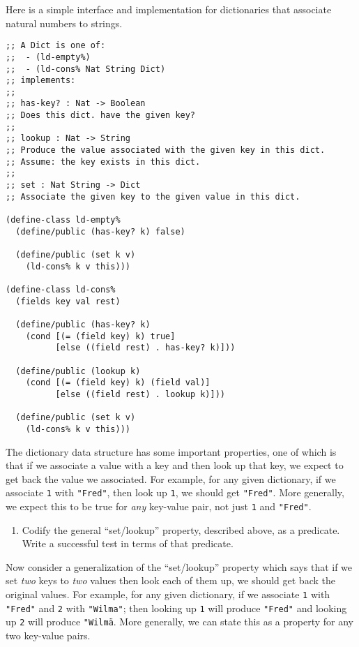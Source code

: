 \documentclass[12pt]{article}                   %
\def\pts#1{\marginpar{\footnotesize \raggedright  \fbox{#1 {\sc Points}}}}
\newcommand\code[1]{\texttt{#1}}
\begin{document}
\begin{problem} \pts{15}
%
Here is a simple interface and implementation for dictionaries that
associate natural numbers to strings.

\begin{verbatim}
;; A Dict is one of:
;;  - (ld-empty%)
;;  - (ld-cons% Nat String Dict)
;; implements:
;;
;; has-key? : Nat -> Boolean
;; Does this dict. have the given key?
;;
;; lookup : Nat -> String
;; Produce the value associated with the given key in this dict.
;; Assume: the key exists in this dict.
;;
;; set : Nat String -> Dict
;; Associate the given key to the given value in this dict.

(define-class ld-empty%
  (define/public (has-key? k) false)

  (define/public (set k v)
    (ld-cons% k v this)))

(define-class ld-cons%
  (fields key val rest)

  (define/public (has-key? k)
    (cond [(= (field key) k) true]
          [else ((field rest) . has-key? k)]))

  (define/public (lookup k)
    (cond [(= (field key) k) (field val)]
          [else ((field rest) . lookup k)]))

  (define/public (set k v)
    (ld-cons% k v this)))
\end{verbatim}

The dictionary data structure has some important properties, one of
which is that if we associate a value with a key and then look up that
key, we expect to get back the value we associated.  For example, for
any given dictionary, if we associate \code{1} with \code{"Fred"},
then look up \code{1}, we should get \code{"Fred"}.  More generally,
we expect this to be true for \emph{any} key-value pair, not just
\code{1} and \code{"Fred"}.

\begin{enumerate}
\item Codify the general ``set/lookup'' property, described above, as
  a predicate.  Write a successful test in terms of that predicate.
\end{enumerate}

Now consider a generalization of the ``set/lookup'' property which
says that if we set \emph{two} keys to \emph{two} values then look
each of them up, we should get back the original values.  For example, for
any given dictionary, if we associate \code{1} with \code{"Fred"} and
\code{2} with \code{"Wilma"}; then looking up \code{1} will produce
\code{"Fred"} and looking up \code{2} will produce \code{"Wilma\"}.
More generally, we can state this as a property for any two key-value
pairs. 


\end{problem}
\end{document}
